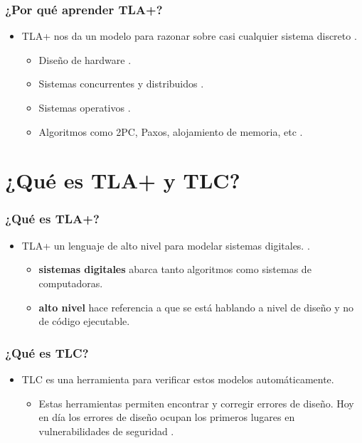 \documentclass{beamer}
\begin{document}
\begin{frame}
  \frametitle{¿Por qué aprender TLA+?}

  \begin{itemize}
    \item TLA+ nos da un modelo para razonar sobre casi cualquier sistema discreto
          \cite{lamport1999specifying}.
          \begin{itemize}
            \item Diseño de hardware \cite{lamport2001wildfire}.
            \item Sistemas concurrentes y distribuidos \cite{newcombe2015amazon}.
            \item Sistemas operativos \cite{verhulst2011formal}.
            \item Algoritmos como 2PC, Paxos, alojamiento de memoria, etc \cite{githubtla}.
          \end{itemize}
  \end{itemize}
\end{frame}

\section{¿Qué es TLA+ y TLC?}

\begin{frame}
  \frametitle{¿Qué es TLA+?}

  \begin{itemize}
    \item TLA+ un lenguaje de alto nivel para modelar sistemas digitales. \cite{tlacourse}.
          \begin{itemize}
            \item \textbf{sistemas digitales} abarca tanto algoritmos como sistemas de computadoras.
            \item \textbf{alto nivel} hace referencia a que se está hablando a nivel de diseño y no de código ejecutable.
          \end{itemize}
  \end{itemize}
\end{frame}

\begin{frame}
  \frametitle{¿Qué es TLC?}

  \begin{itemize}
    \item TLC es una herramienta para verificar estos modelos automáticamente.
          \begin{itemize}
            \item Estas herramientas permiten encontrar y corregir errores de diseño. Hoy en día los errores de diseño ocupan los primeros lugares en vulnerabilidades de seguridad \cite{owasp4}.
          \end{itemize}
  \end{itemize}
\end{frame}
\end{document}
